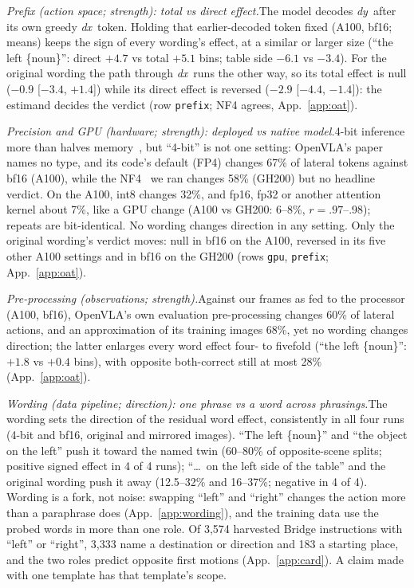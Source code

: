 \documentclass[conference]{IEEEtran}
\newcommand{\dy}{\textit{dy}}
\newcommand{\dx}{\textit{dx}}
\newcommand{\rowid}[1]{\texttt{#1}}
\newcommand{\head}[1]{\textit{#1}\hspace{0.4em}}
\begin{document}
\head{Prefix (action space; strength): total vs direct effect.}The model decodes \dy\ after its own greedy \dx\ token. Holding that earlier-decoded token fixed (A100, bf16; means) keeps the sign of every wording's effect, at a similar or larger size (``the left \{noun\}'': direct $+4.7$ vs total $+5.1$ bins; table side $-6.1$ vs $-3.4$). For the original wording the path through \dx\ runs the other way, so its total effect is null ($-0.9$ [$-3.4$, $+1.4$]) while its direct effect is reversed ($-2.9$ [$-4.4$, $-1.4$]): the estimand decides the verdict (row \rowid{prefix}; NF4 agrees, App.~\ref{app:oat}).

\head{Precision and GPU (hardware; strength): deployed vs native model.}4-bit inference more than halves memory~\cite{kim2024openvla}, but ``4-bit'' is not one setting: OpenVLA's paper names no type, and its code's default (FP4) changes 67\% of lateral tokens against bf16 (A100), while the NF4~\cite{dettmers2023qlora} we ran changes 58\% (GH200) but no headline verdict. On the A100, int8 changes 32\%, and fp16, fp32 or another attention kernel about 7\%, like a GPU change (A100 vs GH200: 6--8\%, $r=.97$--.98); repeats are bit-identical. No wording changes direction in any setting. Only the original wording's verdict moves: null in bf16 on the A100, reversed in its five other A100 settings and in bf16 on the GH200 (rows \rowid{gpu}, \rowid{prefix}; App.~\ref{app:oat}).

\head{Pre-processing (observations; strength).}Against our frames as fed to the processor (A100, bf16), OpenVLA's own evaluation pre-processing changes 60\% of lateral actions, and an approximation of its training images 68\%, yet no wording changes direction; the latter enlarges every word effect four- to fivefold (``the left \{noun\}'': $+1.8$ vs $+0.4$ bins), with opposite both-correct still at most 28\% (App.~\ref{app:oat}).

\head{Wording (data pipeline; direction): one phrase vs a word across phrasings.}The wording sets the direction of the residual word effect, consistently in all four runs (4-bit and bf16, original and mirrored images). ``The left \{noun\}'' and ``the object on the left'' push it toward the named twin (60--80\% of opposite-scene splits; positive signed effect in 4 of 4 runs); ``\dots\ on the left side of the table'' and the original wording push it away (12.5--32\% and 16--37\%; negative in 4 of 4). Wording is a fork, not noise: swapping ``left'' and ``right'' changes the action more than a paraphrase does (App.~\ref{app:wording}), and the training data use the probed words in more than one role. Of 3,574 harvested Bridge instructions with ``left'' or ``right'', 3,333 name a destination or direction and 183 a starting place, and the two roles predict opposite first motions (App.~\ref{app:card}). A claim made with one template has that template's scope.
\end{document}

